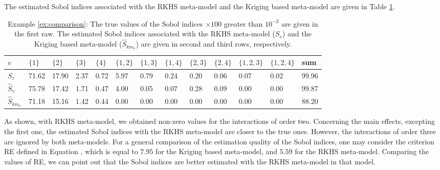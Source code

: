 The estimated Sobol indices associated with the RKHS meta-model and the Kriging based meta-model are given in Table \ref{trueSIcomparison}.
\begin{table}[h!]
\centering
\small{
{\setlength{\tabcolsep}{4pt}
\begin{tabular}{l|lllllllllll|l} 
 $v$ & $\{1\}$ & $\{2\}$ & $\{3\}$ & $\{4\}$ & $\{1,2\}$ & $\{1,3\}$ & $\{1,4\}$ & $\{2,3\}$ & $\{2,4\}$ & $\{1,2,3\}$ &$\{1,2,4\}$ &  sum \\ \hline
 $S_v$ & 71.62 & 17.90 & 2.37 & 0.72 & 5.97 & 0.79 & 0.24 & 0.20 & 0.06 & 0.07 & 0.02& 99.96 \\ 
 $\widehat{S}_v$ & 75.78 & 17.42 & 1.71 & 0.47 & 4.00 & 0.05 & 0.07 & 0.28 & 0.09 & 0.00 & 0.00 & 99.87 \\
 $\widehat{S}_{km_v}$ & 71.18 & 15.16 & 1.42 & 0.44 & 0.00 & 0.00 & 0.00 & 0.00 & 0.00 & 0.00 & 0.00 & 88.20 \\
\end{tabular}}}
\caption{Example \ref{ex:comparison}: The true values of the Sobol indices
$\times100$ greater than $10^{-2}$ are given in the first raw. The estimated Sobol indices associated with the RKHS meta-model ($\widehat{S}_v$) and the Kriging based meta-model ($\widehat{S}_{km_v}$) are given in second and third rows, respectively.}
\label{trueSIcomparison}
\end{table} 
As shown, with RKHS meta-model, we obtained non-zero values for the interactions of order two. Concerning the main effects, excepting the first one, the estimated Sobol indices with the RKHS meta-model are closer to the true ones. However, the interactions of order three are ignored by both meta-models. For a general comparison of the estimation quality of the Sobol indices, one may consider the criterion RE defined in Equation , which is equal to $7.95$ for the Kriging based meta-model, and $5.59$ for the RKHS meta-model. Comparing the values of RE, we can point out that the Sobol indices are better estimated with the RKHS meta-model in that model.
\vspace{0.3cm}
